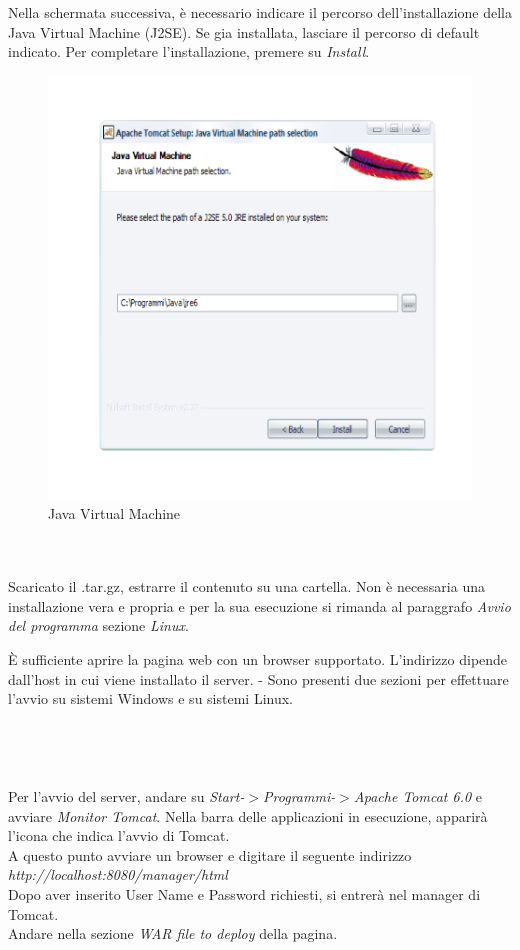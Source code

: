 Nella schermata successiva, \`e necessario indicare il percorso dell'installazione della Java Virtual Machine (J2SE). Se gia installata, lasciare il percorso di default
indicato.
Per completare l'installazione, premere su \textit{Install}.
 
\begin{figure}[!ht]
\centering
\includegraphics[scale=0.7]{images/InstallTomcat4.png}
\caption{Java Virtual Machine}
\end{figure}
 
\\
\\
Scaricato il .tar.gz, estrarre il contenuto su una cartella.
Non \`e necessaria una installazione vera e propria e per la sua esecuzione si rimanda al paraggrafo \textit{Avvio del programma} sezione \textit{Linux}.
 
\`E sufficiente aprire la pagina web con un browser supportato. L'indirizzo dipende dall'host in cui viene installato il server.
-
Sono presenti due sezioni per effettuare l'avvio su sistemi Windows e su sistemi Linux.\\
\\\\
\\
\\
Per l'avvio del server, andare su \textit{Start-$ > $Programmi-$ > $Apache Tomcat 6.0} e avviare \textit{Monitor Tomcat}.
Nella barra delle applicazioni in esecuzione, apparir\`a l'icona che indica l'avvio di Tomcat.\\
A questo punto avviare un browser e digitare il seguente indirizzo\\ \textit{http://localhost:8080/manager/html}\\
Dopo aver inserito User Name e Password richiesti, si entrer\`a nel manager di Tomcat.\\
Andare nella sezione \textit{WAR file to deploy} della pagina.\\
 
